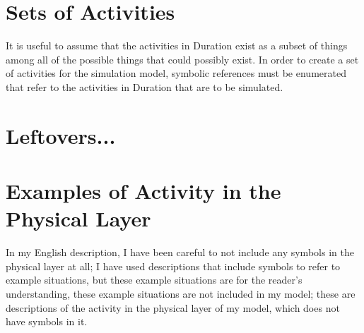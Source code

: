 \section{Sets of Activities}

It is useful to assume that the activities in Duration exist as a
subset of things among all of the possible things that could possibly
exist.  In order to create a set of activities for the simulation
model, symbolic references must be enumerated that refer to the
activities in Duration that are to be simulated.



\section{Leftovers...}

\section{Examples of Activity in the Physical Layer}

In my English description, I have been careful to not include any
symbols in the physical layer at all; I have used descriptions that
include symbols to refer to example situations, but these example
situations are for the reader's understanding, these example
situations are not included in my model; these are descriptions of the
activity in the physical layer of my model, which does not have
symbols in it.
